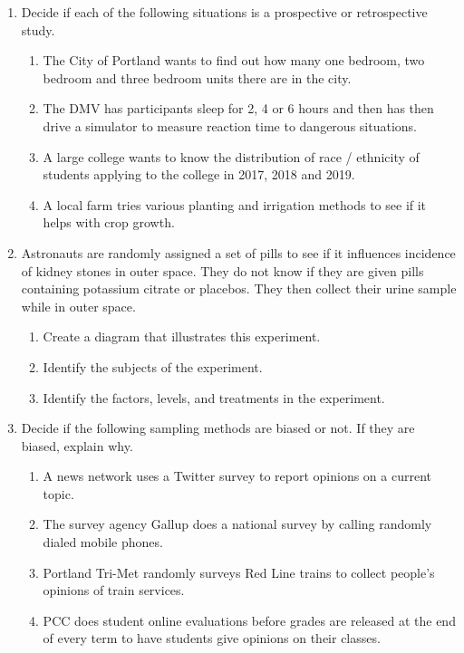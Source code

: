 \begin{enumerate}
 \item Decide if each of the following situations is a prospective or retrospective study.

 \begin{enumerate}
  \item The City of Portland wants to find out how many one bedroom, two bedroom and three bedroom units there are in the city.
  \item The DMV has participants sleep for 2, 4 or 6 hours and then has then drive a simulator to measure reaction time to dangerous situations.
  \item A large college wants to know the distribution of race / ethnicity of students applying to the college in 2017, 2018 and 2019.
  \item A local farm tries various planting and irrigation methods to see if it helps with crop growth.
 \end{enumerate}

 \item Astronauts are randomly assigned a set of pills to see if it influences incidence of kidney stones in outer space. They do not know if they are given pills containing potassium citrate or placebos.  They then collect their urine sample while in outer space.
 \begin{enumerate}
 \item Create a diagram that illustrates this experiment.
 \item Identify the subjects of the experiment.
 \item Identify the factors, levels, and treatments in the experiment.
 \end{enumerate}

 \item Decide if the following sampling methods are biased or not. If they are biased, explain why.
 \begin{enumerate}
  \item A news network uses a Twitter survey to report opinions on a current topic.
  \item The survey agency Gallup does a national survey by calling randomly dialed mobile phones.
  \item Portland Tri-Met randomly surveys Red Line trains to collect people's opinions of train services.
  \item PCC does student online evaluations before grades are released at the end of every term to have students give opinions on their classes. 
 \end{enumerate}
\end{enumerate}